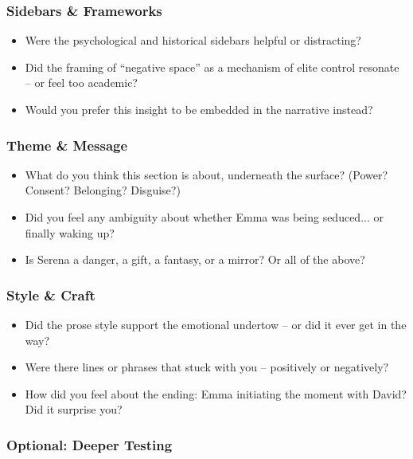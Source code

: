 \subsubsection{Sidebars \& Frameworks}

\begin{itemize}
  \item Were the psychological and historical sidebars helpful or distracting?
  \item Did the framing of ``negative space'' as a mechanism of elite control resonate -- or feel too academic?
  \item Would you prefer this insight to be embedded in the narrative instead?
\end{itemize}

\subsubsection{Theme \& Message}

\begin{itemize}
  \item What do you think this section is about, underneath the surface? (Power? Consent? Belonging? Disguise?)
  \item Did you feel any ambiguity about whether Emma was being seduced... or finally waking up?
  \item Is Serena a danger, a gift, a fantasy, or a mirror? Or all of the above?
\end{itemize}

\subsubsection{Style \& Craft}

\begin{itemize}
  \item Did the prose style support the emotional undertow -- or did it ever get in the way?
  \item Were there lines or phrases that stuck with you -- positively or negatively?
  \item How did you feel about the ending: Emma initiating the moment with David? Did it surprise you?
\end{itemize}

\subsubsection{Optional: Deeper Testing}

